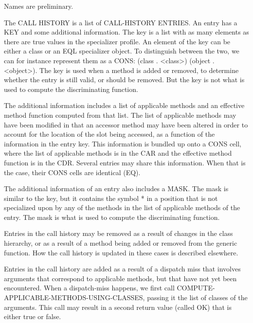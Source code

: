 Names are preliminary.

The CALL HISTORY is a list of CALL-HISTORY ENTRIES.  An entry has a
KEY and some additional information.  The key is a list with as many
elements as there are true values in the specializer profile.  An
element of the key can be either a class or an EQL specializer object.
To distinguish between the two, we can for instance represent them as
a CONS: (class . <class>) (object . <object>).  The key is used when a
method is added or removed, to determine whether the entry is still
valid, or should be removed.  But the key is not what is used to
compute the discriminating function.

The additional information includes a list of applicable methods and
an effective method function computed from that list.  The list of
applicable methods may have been modified in that an accessor method
may have been altered in order to account for the location of the slot
being accessed, as a function of the information in the entry key.
This information is bundled up onto a CONS cell, where the list of
applicable methods is in the CAR and the effective method function is
in the CDR. Several entries may share this information.  When that is
the case, their CONS cells are identical (EQ).

The additional information of an entry also includes a MASK.  The mask
is similar to the key, but it contains the symbol * in a position that
is not specialized upon by any of the methods in the list of
applicable methods of the entry.  The mask is what is used to compute
the discriminating function.

Entries in the call history may be removed as a result of changes in
the class hierarchy, or as a result of a method being added or removed
from the generic function.  How the call history is updated in these
cases is described elsewhere.

Entries in the call history are added as a result of a dispatch miss
that involves arguments that correspond to applicable methods, but
that have not yet been encountered.  When a dispatch-miss happens, we
first call COMPUTE-APPLICABLE-METHODS-USING-CLASSES, passing it the
list of classes of the arguments.  This call may result in a second
return value (called OK) that is either true or false.

